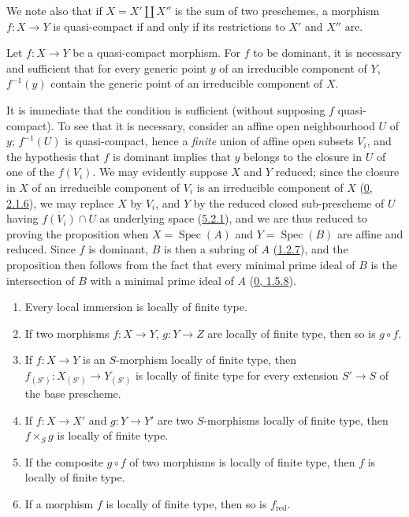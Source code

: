 We note also that if $X=X'\amalg X''$ is the sum of two preschemes, a
morphism $f:X\to Y$ is quasi-compact if and only if its restrictions to
$X'$ and $X''$ are.

\begin{proposition}[6.6.5]
\label{I.6.6.5}
Let $f:X\to Y$ be a quasi-compact morphism. For $f$ to be dominant, it is
necessary and sufficient that for every generic point $y$ of an irreducible
component of $Y$, $f^{-1}(y)$ contain the generic point of an irreducible
component of $X$.
\end{proposition}

It is immediate that the condition is sufficient (without supposing $f$
quasi-compact). To see that it is necessary, consider an affine open
neighbourhood $U$ of $y$; $f^{-1}(U)$ is quasi-compact, hence a
\emph{finite} union of affine open subsets $V_i$, and the hypothesis that $f$ is
dominant implies that $y$ belongs to the closure in $U$ of one of the
$f(V_i)$. We may evidently suppose $X$ and $Y$ reduced; since the closure in
$X$ of an irreducible component of $V_i$ is an irreducible component of $X$
(\hyperref[0.2.1.6]{0, 2.1.6}), we may replace $X$ by $V_i$, and $Y$ by
the reduced closed sub-prescheme of $U$ having $\overline{f(V_i)}\cap U$ as
underlying space (\hyperref[I.5.2.1]{5.2.1}), and we are thus reduced to
proving the proposition when $X=\operatorname{Spec}(A)$ and
$Y=\operatorname{Spec}(B)$ are affine and reduced. Since $f$ is dominant,
$B$ is then a subring of $A$ (\hyperref[I.1.2.7]{1.2.7}), and the
proposition then follows from the fact that every minimal prime ideal of $B$
is the intersection of $B$ with a minimal prime ideal of $A$
(\hyperref[0.1.5.8]{0, 1.5.8}).

\begin{proposition}[6.6.6]
\label{I.6.6.6}
\begin{enumerate}
  \item[(i)] Every local immersion is locally of finite type.
  \item[(ii)] If two morphisms $f:X\to Y$, $g:Y\to Z$ are locally of finite
    type, then so is $g\circ f$.
  \item[(iii)] If $f:X\to Y$ is an $S$-morphism locally of finite type, then
    $f_{(S')}:X_{(S')}\to Y_{(S')}$ is locally of finite type for every
    extension $S'\to S$ of the base prescheme.
  \item[(iv)] If $f:X\to X'$ and $g:Y\to Y'$ are two $S$-morphisms
    locally of finite type, then $f\times_S g$ is locally of finite type.
  \item[(v)] If the composite $g\circ f$ of two morphisms is locally of
    finite type, then $f$ is locally of finite type.
  \item[(vi)] If a morphism $f$ is locally of finite type, then so is
    $f_{\mathrm{red}}$.
\end{enumerate}
\end{proposition}

